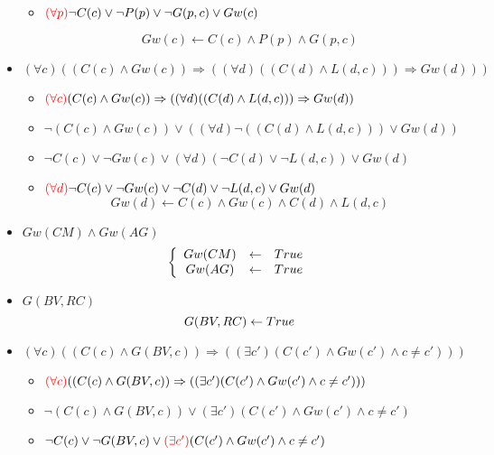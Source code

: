 \documentclass[alternative-exam.tex]{subfiles}
\begin{document}
\begin{itemize}
\begin{itemize}
\item ${\color{red}(\forall p)} \neg C(c) \vee \neg P(p) \vee \neg G(p,c) \vee Gw(c)$

\[Gw(c)\leftarrow C(c) \wedge P(p) \wedge G(p,c)\]
\end{itemize}
\item $(\forall c)(( C(c) \wedge Gw(c)) \Rightarrow ((\forall d)(( C(d) \wedge L(d,c)))\Rightarrow Gw(d)))$
\begin{itemize}
\item ${\color{red}(\forall c)}( C(c) \wedge Gw(c)) \Rightarrow ((\forall d)(( C(d) \wedge L(d,c)))\Rightarrow Gw(d))$

\item $\neg( C(c) \wedge Gw(c)) \vee ((\forall d)\neg(( C(d) \wedge L(d,c)))\vee Gw(d))$

\item $\neg C(c) \vee \neg Gw(c) \vee (\forall d)( \neg C(d) \vee \neg L(d,c))\vee Gw(d)$

\item ${\color{red}(\forall d)} \neg C(c) \vee \neg Gw(c) \vee \neg C(d) \vee \neg L(d,c)\vee Gw(d)$
\[
 Gw(d)\leftarrow
C(c) \wedge Gw(c) \wedge C(d) \wedge L(d,c) \]
\end{itemize}

\item $Gw(CM) \wedge Gw(AG)$
\[
\left\{
\begin{array}{c c c}
Gw(CM) &\leftarrow& True\\
Gw(AG) &\leftarrow& True\\
\end{array}
\right.
\]

\item $G(BV,RC)$
\[
G(BV,RC) \leftarrow True\\
\]

\item $(\forall c) ((C(c) \wedge G(BV,c)) \Rightarrow ((\exists c') (C(c') \wedge Gw(c') \wedge c \neq c')))$
\begin{itemize}
\item ${\color{red}(\forall c)}((C(c) \wedge G(BV,c)) \Rightarrow ((\exists c') (C(c') \wedge Gw(c') \wedge c \neq c')))$

\item $\neg (C(c) \wedge G(BV,c)) \vee (\exists c') (C(c') \wedge Gw(c') \wedge c \neq c')$

\item $\neg C(c) \vee \neg G(BV,c) \vee {\color{red} (\exists c')} (C(c') \wedge Gw(c') \wedge c \neq c')$


\end{itemize}
\end{itemize}
\end{document}
